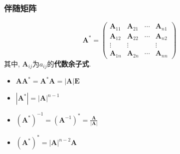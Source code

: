 \documentclass{article}
\begin{document}
			\subsubsection{伴随矩阵}
				$$
				\boldsymbol{A}^{*}=
				\left(\begin{array}{cccc}
					\boldsymbol A_{11} & \boldsymbol A_{21} & \cdots & \boldsymbol A_{n 1} \\
					\boldsymbol A_{12} & \boldsymbol A_{22} & \cdots & \boldsymbol A_{n 2} \\
					\vdots & \vdots & & \vdots \\
					\boldsymbol A_{1 n} & \boldsymbol A_{2 n} & \cdots & \boldsymbol A_{n n}
				\end{array}\right)
				$$
				其中, $\boldsymbol A_{ij}$为$a_{ij}$的\textbf{代数余子式}.
				\begin{itemize}
					\item$\boldsymbol{A}\boldsymbol{A}^{*}=\boldsymbol{A}^{*}\boldsymbol{A}=\left|\boldsymbol{A}\right|\boldsymbol{E}$
					\item$\left|\boldsymbol{A}^*\right|=\left|\boldsymbol{A}\right|^{n-1}$
					\item$(\boldsymbol{A}^*)^{-1}=(\boldsymbol{A}^{-1})^*=\frac{\boldsymbol{A}}{\left|\boldsymbol{A}\right|}$
					\item$(\boldsymbol{A}^*)^*=\left|\boldsymbol{A}\right|^{n-2}\boldsymbol{A}$
				\end{itemize}
\end{document}
